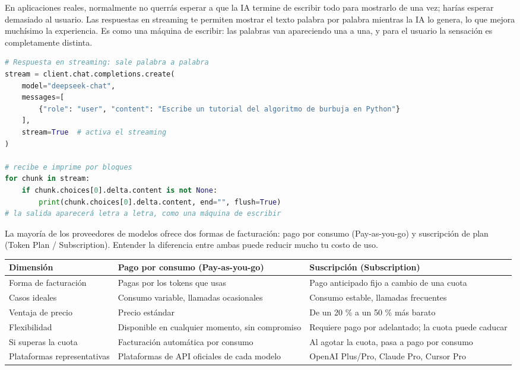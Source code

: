
En aplicaciones reales, normalmente no querrás esperar a que la IA termine de escribir todo para mostrarlo de una vez; harías esperar demasiado al usuario. Las respuestas en streaming te permiten mostrar el texto palabra por palabra mientras la IA lo genera, lo que mejora muchísimo la experiencia. Es como una máquina de escribir: las palabras van apareciendo una a una, y para el usuario la sensación es completamente distinta.

\begin{lstlisting}[language=Python]
# Respuesta en streaming: sale palabra a palabra
stream = client.chat.completions.create(
    model="deepseek-chat",
    messages=[
        {"role": "user", "content": "Escribe un tutorial del algoritmo de burbuja en Python"}
    ],
    stream=True  # activa el streaming
)

# recibe e imprime por bloques
for chunk in stream:
    if chunk.choices[0].delta.content is not None:
        print(chunk.choices[0].delta.content, end="", flush=True)
# la salida aparecerá letra a letra, como una máquina de escribir
\end{lstlisting}


La mayoría de los proveedores de modelos ofrece dos formas de facturación: pago por consumo (Pay-as-you-go) y suscripción de plan (Token Plan / Subscription). Entender la diferencia entre ambas puede reducir mucho tu costo de uso.


\begin{center}
\begin{tabularx}{\linewidth}{|X|X|X|}
\hline
\textbf{Dimensión} & \textbf{Pago por consumo (Pay-as-you-go)} & \textbf{Suscripción (Subscription)} \tabularnewline
\hline
Forma de facturación & Pagas por los tokens que usas & Pago anticipado fijo a cambio de una cuota \tabularnewline
Casos ideales & Consumo variable, llamadas ocasionales & Consumo estable, llamadas frecuentes \tabularnewline
Ventaja de precio & Precio estándar & De un 20 \% a un 50 \% más barato \tabularnewline
Flexibilidad & Disponible en cualquier momento, sin compromiso & Requiere pago por adelantado; la cuota puede caducar \tabularnewline
Si superas la cuota & Facturación automática por consumo & Al agotar la cuota, pasa a pago por consumo \tabularnewline
Plataformas representativas & Plataformas de API oficiales de cada modelo & OpenAI Plus/Pro, Claude Pro, Cursor Pro \tabularnewline
\hline
\end{tabularx}
\end{center}


